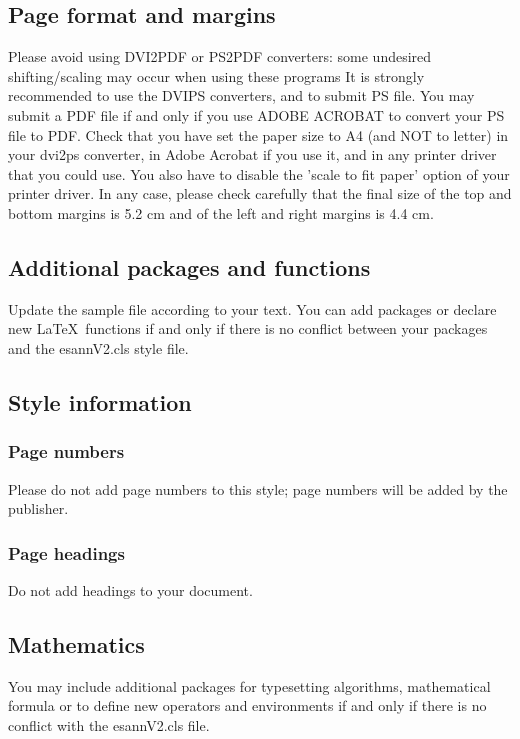\documentclass{esannV2}
\begin{document}
\subsection{Page format and margins}
Please avoid using DVI2PDF or PS2PDF converters: some undesired
shifting/scaling may occur when using these programs
It is strongly recommended to use the DVIPS converters, and to submit
PS file. You may submit a PDF file if and only if you use ADOBE ACROBAT
to convert your PS file to PDF.
%
Check that you have set the paper size to A4 (and NOT to letter) in your
dvi2ps converter, in Adobe Acrobat if you use it, and in any printer driver
that you could use.  You also have to disable the 'scale to fit paper' option
of your printer driver.
%
In any case, please check carefully that the final size of the top and
bottom margins is 5.2 cm and of the left and right margins is 4.4 cm.


\subsection{Additional packages and functions}

Update the sample file according to your text. You can add
packages or declare new \LaTeX\ functions if and only if there is no conflict between your packages and the esannV2.cls style file.

\subsection{Style information}

\subsubsection{Page numbers}
Please do not add page numbers to this style; page numbers will be added by the publisher.
\subsubsection{Page headings}
Do not add headings to your document.
\subsection{Mathematics}
You may include additional packages for typesetting
algorithms, mathematical formula or to define new operators and environments
if and only if there is no conflict with the esannV2.cls
file.
\end{document}
